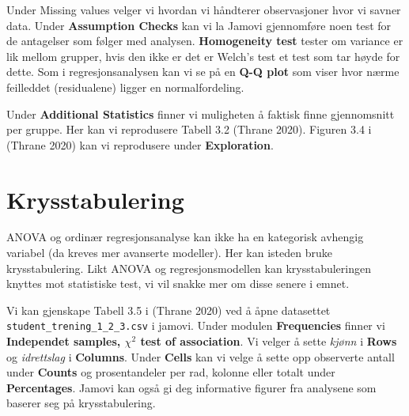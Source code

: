 \documentclass[
  letterpaper,
  DIV=11,
  numbers=noendperiod,
  oneside]{scrreprt}
\begin{document}
Under Missing values velger vi hvordan vi håndterer observasjoner hvor
vi savner data. Under \textbf{Assumption Checks} kan vi la Jamovi
gjennomføre noen test for de antagelser som følger med analysen.
\textbf{Homogeneity test} tester om variance er lik mellom grupper, hvis
den ikke er det er Welch's test et test som tar høyde for dette. Som i
regresjonsanalysen kan vi se på en \textbf{Q-Q plot} som viser hvor
nærme feilleddet (residualene) ligger en normalfordeling.

Under \textbf{Additional Statistics} finner vi muligheten å faktisk
finne gjennomsnitt per gruppe. Her kan vi reprodusere Tabell 3.2 (Thrane
2020).
Figuren 3.4 i (Thrane
2020)
kan vi reprodusere under \textbf{Exploration}.

\hypertarget{krysstabulering}{%
\section{Krysstabulering}\label{krysstabulering}}

ANOVA og ordinær regresjonsanalyse kan ikke ha en kategorisk avhengig
variabel (da kreves mer avanserte modeller). Her kan isteden bruke
krysstabulering. Likt ANOVA og regresjonsmodellen kan krysstabuleringen
knyttes mot statistiske test, vi vil snakke mer om disse senere i emnet.

Vi kan gjenskape Tabell 3.5 i (Thrane
2020)
ved å åpne datasettet \texttt{student\_trening\_1\_2\_3.csv} i jamovi.
Under modulen \textbf{Frequencies} finner vi \textbf{Independet samples,
\(\chi^2\) test of association}. Vi velger å sette \emph{kjønn} i
\textbf{Rows} og \emph{idrettslag} i \textbf{Columns}. Under
\textbf{Cells} kan vi velge å sette opp observerte antall under
\textbf{Counts} og prosentandeler per rad, kolonne eller totalt under
\textbf{Percentages}. Jamovi kan også gi deg informative figurer fra
analysene som baserer seg på krysstabulering.
\end{document}
